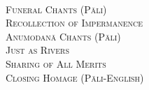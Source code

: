 {  {\libertinusFont\selectfont\textbf{\textsc{}}}\\

  \textsc{
    Funeral Chants (Pāli) \pageref{pubba-bhaga-nama-kara-patho}\\
    Recollection of Impermanence \pageref{recollection-impermanence}\\
    Anumodanā Chants (Pāli) \pageref{yatha-vari-vaha-pura}\\
    Just as Rivers \pageref{just-as-rivers}\\
    Sharing of All Merits \pageref{sharing-all-merits}\\
    Closing Homage (Pāli-English) \pageref{closing-homage}}\\

}

